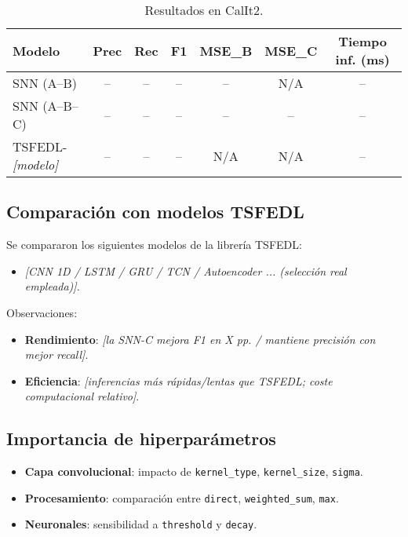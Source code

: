 \begin{table}[htbp]
\centering
\small
\begin{tabular}{lcccccc}
\hline\hline
\textbf{Modelo} & \textbf{Prec} & \textbf{Rec} & \textbf{F1} & \textbf{MSE\_B} & \textbf{MSE\_C} & \textbf{Tiempo inf. (ms)} \\
\hline
SNN (A--B) & -- & -- & -- & -- & N/A & -- \\
SNN (A--B--C) & -- & -- & -- & -- & -- & -- \\
TSFEDL-\textit{[modelo]} & -- & -- & -- & N/A & N/A & -- \\
\hline\hline
\end{tabular}
\caption{Resultados en CalIt2.}
\label{tab:resultados-calit2}
\end{table}

\subsection{Comparación con modelos TSFEDL}
Se compararon los siguientes modelos de la librería TSFEDL:
\begin{itemize}
    \item \textit{[CNN 1D / LSTM / GRU / TCN / Autoencoder ... (selección real empleada)]}.
\end{itemize}
Observaciones:
\begin{itemize}
    \item \textbf{Rendimiento}: \textit{[la SNN-C mejora F1 en X pp. / mantiene precisión con mejor recall]}.
    \item \textbf{Eficiencia}: \textit{[inferencias más rápidas/lentas que TSFEDL; coste computacional relativo]}.
\end{itemize}

\subsection{Importancia de hiperparámetros}
\begin{itemize}
    \item \textbf{Capa convolucional}: impacto de \texttt{kernel\_type}, \texttt{kernel\_size}, \texttt{sigma}.
    \item \textbf{Procesamiento}: comparación entre \texttt{direct}, \texttt{weighted\_sum}, \texttt{max}.
    \item \textbf{Neuronales}: sensibilidad a \texttt{threshold} y \texttt{decay}.
\end{itemize}

